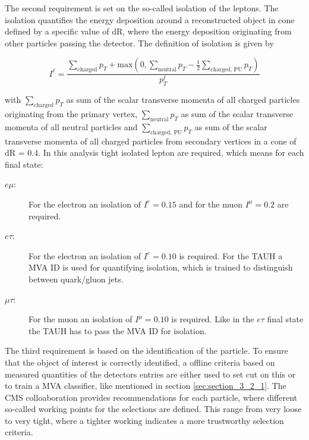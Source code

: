 The second requirement is set on the so-called isolation of the leptons. The isolation quantifies the energy deposition around a reconstructed object in cone defined by a specific value of \gls{dR}, where the energy deposition originating from other particles passing the detector. The definition of isolation is given by

\begin{equation}
	\label{eq:eq_3_1}
	I^{\ell} = \frac{\sum_{\text{charged}} p_{T} + \text{max}(0, \sum_{\text{neutral}} p_{T} - \frac{1}{2}\sum_{\text{charged, PU}} p_{T})}{p_T^{\ell}}  
\end{equation} 

with $\sum_{\text{charged}} p_{T}$ as sum of the scalar transverse momenta of all charged particles originating from the primary vertex, $\sum_{\text{neutral}} p_{T}$ as sum of the scalar transverse momenta of all neutral particles and $\sum_{\text{charged, PU}} p_{T}$ as sum of the scalar transverse momenta of all charged particles from secondary vertices in a cone of \gls{dR} = 0.4. In this analysis tight isolated lepton are required, which means for each final state: 

\begin{description}
	\item [$e\mu$:] For the electron an isolation of $I^{e} = 0.15$ and for the muon $I^{\mu} = 0.2$ are required. 
	\item [$e\tau$:]  For the electron an isolation of $I^{e} = 0.10$ is required. For the \gls{TAUH} a \gls{MVA} ID is used for quantifying isolation, which is trained to distinguish between quark/gluon jets. 
	\item [$\mu\tau$:]  For the muon an isolation of $I^{\mu} = 0.10$ is required. Like in the $e\tau$ final state the \gls{TAUH} has to pass the \gls{MVA} ID for isolation.
\end{description}


The third requirement is based on the identification of the particle. To ensure that the object of interest is correctly identified, a offline criteria based on measured quantities of the detectors entries are either used to set cut on this or to train a \gls{MVA} classifier, like mentioned in section \ref{sec:section_3_2_1}. The \gls{CMS} colloaboration provides recommendations for each particle, where different so-called working points for the selections are defined. This range from very loose to very tight, where a tighter working indicates a more trustworthy selection criteria. 


